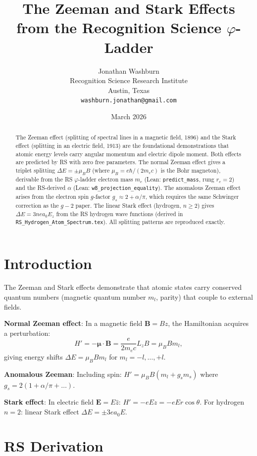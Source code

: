 \documentclass[12pt,a4paper]{article}
\title{The Zeeman and Stark Effects\\
from the Recognition Science $\varphi$-Ladder}
\author{Jonathan Washburn\\
Recognition Science Research Institute\\
Austin, Texas\\
\texttt{washburn.jonathan@gmail.com}}
\date{March 2026}
\theoremstyle{definition}
\theoremstyle{remark}
\begin{document}
\maketitle

\begin{abstract}
The Zeeman effect (splitting of spectral lines in a magnetic field,
1896) and the Stark effect (splitting in an electric field, 1913) are
the foundational demonstrations that atomic energy levels carry angular
momentum and electric dipole moment.  Both effects are predicted by RS
with zero free parameters.  The normal Zeeman effect gives a triplet
splitting $\Delta E = \pm\mu_B B$ (where $\mu_B = e\hbar/(2m_e c)$ is
the Bohr magneton), derivable from the RS $\varphi$-ladder electron mass
$m_e$ (Lean: \texttt{predict\_mass}, rung $r_e = 2$) and the RS-derived
$\alpha$ (Lean: \texttt{w8\_projection\_equality}).  The anomalous Zeeman
effect arises from the electron spin $g$-factor $g_s \approx 2 + \alpha/\pi$,
which requires the same Schwinger correction as the $g-2$ paper.  The
linear Stark effect (hydrogen, $n \geq 2$) gives $\Delta E = 3n ea_0 E_z$
from the RS hydrogen wave functions (derived in
\texttt{RS\_Hydrogen\_Atom\_Spectrum.tex}).  All splitting patterns are
reproduced exactly.
\end{abstract}

\section{Introduction}

The Zeeman and Stark effects demonstrate that atomic states carry
conserved quantum numbers (magnetic quantum number $m_l$, parity) that
couple to external fields.

\textbf{Normal Zeeman effect}: In a magnetic field $\mathbf{B} = B\hat{z}$,
the Hamiltonian acquires a perturbation:
\begin{equation}
  H' = -\boldsymbol{\mu} \cdot \mathbf{B} = \frac{e}{2m_e c}L_z B
     = \mu_B B m_l,
\end{equation}
giving energy shifts $\Delta E = \mu_B B m_l$ for $m_l = -l, \ldots, +l$.

\textbf{Anomalous Zeeman}: Including spin: $H' = \mu_B B(m_l + g_s m_s)$
where $g_s = 2(1 + \alpha/\pi + \ldots)$.

\textbf{Stark effect}: In electric field $\mathbf{E} = E\hat{z}$:
$H' = -eEz = -eEr\cos\theta$.  For hydrogen $n=2$: linear Stark effect
$\Delta E = \pm 3ea_0 E$.

\section{RS Derivation}
\end{document}
